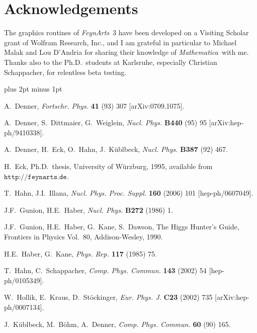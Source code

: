 \documentclass[twoside,12pt]{article}
\def\FA{\textit{FeynArts}}
\def\mma{{\it Mathematica}}
\def\Code#1{\ensuremath{\texttt{#1}}}
\begin{document}
\section*{Acknowledgements}

The graphics routines of \FA\ 3 have been developed on a Visiting
Scholar grant of Wolfram Research, Inc., and I am grateful in particular
to Michael Malak and Lou D'Andria for sharing their knowledge of \mma\
with me.  Thanks also to the Ph.D.\ students at Karlsruhe, especially
Christian Schappacher, for relentless beta testing.


\clearpage

\begin{flushleft}
\begin{thebibliography}{999}

\itemsep 2pt plus 2pt minus 1pt
\frenchspacing

\newcommand{\cpc}[3]{\textsl{Comp. Phys. Commun.} \textbf{#1} (#2) #3}
\newcommand{\fp}[3]{\textsl{Fortschr. Phys.} \textbf{#1} (#2) #3}
\newcommand{\np}[3]{\textsl{Nucl. Phys.} \textbf{#1} (#2) #3}
\newcommand{\npps}[3]{\textsl{Nucl. Phys. Proc. Suppl.} \textbf{#1} (#2) #3}
\newcommand{\epj}[3]{\textsl{Eur. Phys. J.} \textbf{#1} (#2) #3}
\newcommand{\prep}[3]{\textsl{Phys. Rep.} \textbf{#1} (#2) #3}

A.~Denner, \fp{41}{93}{307} [arXiv:0709.1075].

A.~Denner, S.~Dittmaier, G.~Weiglein, \np{B440}{95}{95}
[arXiv:hep-ph/9410338].

A.~Denner, H.~Eck, O.~Hahn, J.~K\"ublbeck, \np{B387}{92}{467}.

H.~Eck, Ph.D.\ thesis, University of W\"urzburg, 1995,
available from \Code{http://feynarts.de}.

T.~Hahn, J.I.~Illana, \npps{160}{2006}{101} [hep-ph/0607049].

J.F.~Gunion, H.E.~Haber, \np{B272}{1986}{1}.

J.F.~Gunion, H.E.~Haber, G.~Kane, S.~Dawson, The Higgs Hunter's
Guide, Frontiers in Physics Vol.\ 80, Addison-Wesley, 1990.

H.E.~Haber, G.~Kane, \prep{117}{1985}{75}.

T.~Hahn, C.~Schappacher, \cpc{143}{2002}{54} [hep-ph/0105349].

W.~Hollik, E.~Kraus, D.~St\"ockinger, \epj{C23}{2002}{735} 
[arXiv:hep-ph/0007134].

J.~K\"ublbeck, M.~B\"ohm, A.~Denner, \cpc{60}{90}{165}.

\end{thebibliography}
\end{flushleft}

\printindex
\end{document}

